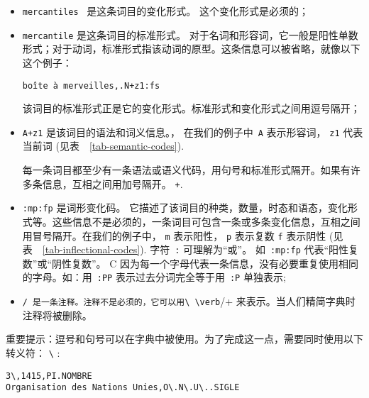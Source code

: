 \bigskip
\begin{itemize}
\item \verb+mercantiles + 是这条词目的变化形式。 这个变化形式是必须的；
  
\bigskip \item \verb+mercantile+ 是这条词目的标准形式。
 对于名词和形容词，它一般是阳性单数形式；对于动词，标准形式指该动词的原型。这条信息可以被省略，就像以下这个例子：

  
\bigskip
\verb$boîte à merveilles,.N+z1:fs$
  
\bigskip 该词目的标准形式正是它的变化形式。标准形式和变化形式之间用逗号隔开；
\index{\verb+,+}
  
\bigskip \item \verb$A+z1$ 是该词目的语法和词义信息。，
 在我们的例子中\ \verb+A+
表示形容词， \verb+z1+ 代表当前词 (见表\ ~\ref{tab-semantic-codes}).

每一条词目都至少有一条语法或语义代码，用句号和标准形式隔开。如果有许多条信息，互相之间用加号隔开。 \verb$+$\index{\verb$+$}.
  
\bigskip
\item \verb+:mp:fp+ 是词形变化码。
 它描述了该词目的种类，数量，时态和语态，变化形式等。这些信息不是必须的，一条词目可包含一条或多条变化信息，互相之间用冒号隔开。在我们的例子中， \verb+m+ 表示阳性，
\verb+p+ 表示复数 \verb+f+ 表示阴性 (见表\ ~\ref{tab-inflectional-codes}). 字符\ \verb+:+ 可理解为“或”。 如\ \verb+:mp:fp+ 代表“阳性复数”或“阴性复数”。 C 因为每一个字母代表一条信息，没有必要重复使用相同的字母。如：用\ \verb+:PP+ 表示过去分词完全等于用\ \verb+:P+ 单独表示;\index{\verb+:+}
  
\bigskip \item \verb+/ 是一条注释。注释不是必须的，它可以用\ \verb+/+ 来表示。当人们精简字典时注释将被删除。 \index{\verb+/+}
\end{itemize}

\bigskip
\noindent 重要提示：逗号和句号可以在字典中被使用。为了完成这一点，需要同时使用以下转义符：
\verb+\+ \index{\verb+\,+}\index{\verb+\.+}\index{\verb+\+}:

\bigskip
\begin{verbatim}
3\,1415,PI.NOMBRE
Organisation des Nations Unies,O\.N\.U\..SIGLE
\end{verbatim}


